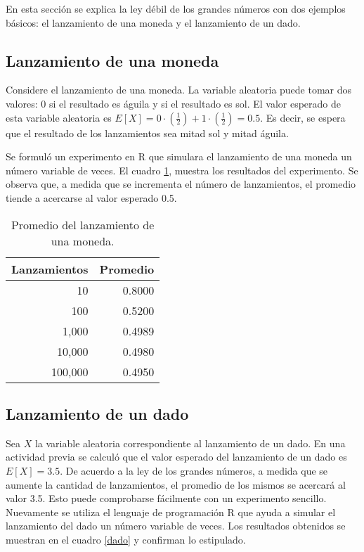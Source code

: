 \documentclass[12pt]{article}
\begin{document}
	En esta sección se explica la ley débil de los grandes números con dos ejemplos básicos: el lanzamiento de una moneda y el lanzamiento de un dado.
	
	\subsection{Lanzamiento de una moneda}
	
	Considere el lanzamiento de una moneda. La variable aleatoria puede tomar dos valores: 0 si el resultado es águila y si el resultado es sol. El valor esperado de esta variable aleatoria es $E[X] = 0\cdot(\frac{1}{2}) + 1\cdot(\frac{1}{2}) = 0.5$. Es decir, se espera que el resultado de los lanzamientos sea mitad sol y mitad águila. 
	
	Se formuló un experimento en \textsc{R} \cite{rstatistics} que simulara el lanzamiento de una moneda un número variable de veces. El cuadro \ref{moneda}, muestra los resultados del experimento. Se observa que, a medida que se incrementa el número de lanzamientos, el promedio tiende a acercarse al valor esperado 0.5.
	
	\begin{table}
		\caption{Promedio del lanzamiento de una moneda.}
		\label{moneda}
		\centering
		\begin{tabular}{|r|r|}
			\hline
			\bf Lanzamientos & \bf Promedio \\
			\hline
			10 & 0.8000 \\
			100 & 0.5200 \\
			1,000 & 0.4989 \\
			10,000 & 0.4980 \\
			100,000 & 0.4950 \\
			\hline
		\end{tabular}
	\end{table}

	\subsection{Lanzamiento de un dado}
	
	Sea $X$ la variable aleatoria correspondiente al lanzamiento de un dado. En una actividad previa se calculó que el valor esperado del lanzamiento de un dado es $E[X] = 3.5$. De acuerdo a la ley de los grandes números, a medida que se aumente la cantidad de lanzamientos, el promedio de los mismos se acercará al valor 3.5. Esto puede comprobarse fácilmente con un experimento sencillo. Nuevamente se utiliza el lenguaje de programación \textsc{R} \cite{rstatistics} que ayuda a simular el lanzamiento del dado un número variable de veces. Los resultados obtenidos se muestran en el cuadro \ref{dado} y confirman lo estipulado.
	
\end{document}
